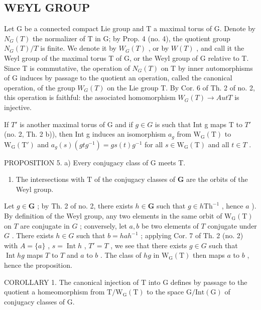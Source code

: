 \subsection{WEYL GROUP}

Let G be a connected compact Lie group and T a maximal torus of G. Denote by \(N_{G}(T)\) the normalizer of T in G; by Prop. 4 (no. 4), the quotient group \(N_{G}(T)/T\) is finite. We denote it by \(W_{G}(T)\) , or by \(W(T)\) , and call it the Weyl group of the maximal torus T of G, or the Weyl group of G relative to T. Since T is commutative, the operation of \(N_{G}(T)\) on T by inner automorphisms of G induces by passage to the quotient an operation, called the canonical operation, of the group \(W_{G}(T)\) on the Lie group T. By Cor. 6 of Th. 2 of no. 2, this operation is faithful: the associated homomorphism \(W_{G}(T) \rightarrow Aut T\) is injective.

If \(T'\) is another maximal torus of G and if \(g \in G\) is such that Int g maps T to \(T'\) (no. 2, Th. 2 b)), then Int g induces an isomorphism \(a_g\) from \(\mathrm{W}_{\mathrm{G}}(\mathrm{T})\) to \(\mathrm{W}_{\mathrm{G}}(\mathrm{T}')\) and \(a_g(s)(gtg^{-1}) = gs(t)g^{-1}\) for all \(s \in \mathrm{W}_{\mathrm{G}}(\mathrm{T})\) and all \(t \in T\) .

PROPOSITION 5. a) Every conjugacy class of G meets T.

\begin{enumerate}
\def\labelenumi{\alph{enumi})}
\setcounter{enumi}{1}
\tightlist
\item
  The intersections with \(\mathrm{T}\) of the conjugacy classes of \(\mathbf{G}\) are the orbits of the Weyl group.
\end{enumerate}

Let \(g \in \mathbf{G}\) ; by Th. 2 of no. 2, there exists \(h \in \mathbf{G}\) such that \(g \in h\mathrm{Th}^{-1}\) , hence \(a\) ). By definition of the Weyl group, any two elements in the same orbit of \(\mathrm{W_G(T)}\) on \(T\) are conjugate in \(G\) ; conversely, let \(a, b\) be two elements of \(T\) conjugate under \(G\) . There exists \(h \in G\) such that \(b = hah^{-1}\) ; applying Cor. 7 of Th. 2 (no. 2) with \(A = \{a\}\) , \(s = \operatorname{Int} h\) , \(T' = T\) , we see that there exists \(g \in G\) such that \(\operatorname{Int} hg\) maps \(T\) to \(T\) and \(a\) to \(b\) . The class of \(hg\) in \(\mathrm{W_G(T)}\) then maps \(a\) to \(b\) , hence the proposition.

COROLLARY 1. The canonical injection of T into G defines by passage to the quotient a homeomorphism from \(\mathrm{T}/\mathrm{W}_{\mathrm{G}}(\mathrm{T})\) to the space \(\mathrm{G}/\mathrm{Int}(\mathrm{G})\) of conjugacy classes of G.

